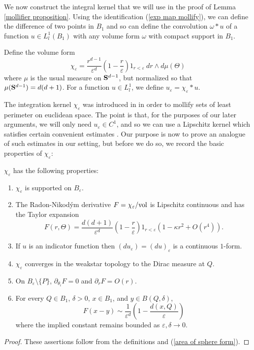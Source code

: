 We now construct the integral kernel that we will use in the proof of Lemma \ref{mollifier proposition}.
Using the identification (\ref{exp map mollify}), we can define the difference of two points in $B_1$ and so can define the convolution $\omega * u$ of a function $u \in L^1_l(B_1)$ with any volume form $\omega$ with compact support in $B_1$.

\begin{definition}
Define the volume form
$$\chi_\varepsilon = \frac{r^{d - 1}}{\varepsilon^d}\left(1 - \frac{r}{\varepsilon}\right)1_{r < \varepsilon} ~dr \wedge d\mu(\Theta)$$
where $\mu$ is the usual measure on $\mathbf S^{d - 1}$, but normalized so that $\mu(\mathbf S^{d - 1}) = d(d + 1)$.
For a function $u \in L^1_l$, we define $u_\varepsilon = \chi_\varepsilon * u$.
\end{definition}

The integration kernel $\chi_\varepsilon$ was introduced in \cite[Chapter 7]{Giusti77} in order to mollify sets of least perimeter on euclidean space.
The point is that, for the purposes of our later arguments, we will only need $u_\varepsilon \in C^1$, and so we can use a Lipschitz kernel which satisfies certain convenient estimates \cite[Lemmata 7.1--7.2]{Giusti77}.
Our purpose is now to prove an analogue of such estimates in our setting, but before we do so, we record the basic properties of $\chi_\varepsilon$:

\begin{lemma}\label{mollifier props}
$\chi_\varepsilon$ has the following properties:
\begin{enumerate}
\item $\chi_\varepsilon$ is supported on $B_\varepsilon$.
\item The Radon-Nikod\'ym derivative $F = \chi_\varepsilon/\mathrm{vol}$ is Lipschitz continuous and has the Taylor expansion
\begin{equation}\label{RN mollify}
F(r, \Theta) = \frac{d(d + 1)}{\varepsilon^d} \left(1 - \frac{r}{\varepsilon}\right) 1_{r < \varepsilon}(1 - \kappa r^2 + O(r^4)).
\end{equation}
\item If $u$ is an indicator function then $(du_\varepsilon) = (du)_\varepsilon$ is a continuous $1$-form.
\item $\chi_\varepsilon$ converges in the weakstar topology to the Dirac measure at $Q$.
\item On $B_\varepsilon \setminus \{P\}$, $\partial_{\theta_i} F = 0$ and $\partial_r F = O(r)$.
\item For every $Q \in B_1$, $\delta > 0$, $x \in B_1$, and $y \in B(Q, \delta)$,
\begin{equation}\label{approximation of mollifier 2}
F(x - y) \sim \frac{1}{\varepsilon^d}\left(1 - \frac{d(x, Q)}{\varepsilon}\right)
\end{equation}
where the implied constant remains bounded as $\varepsilon,\delta \to 0$.
\end{enumerate}
\end{lemma}
\begin{proof}
These assertions follow from the definitions and (\ref{area of sphere form}).
\end{proof}

